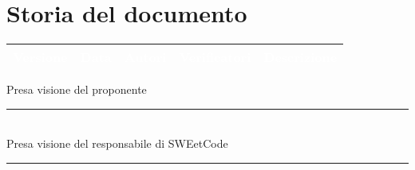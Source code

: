 \newpage
\section{Storia del documento} \label{sec:storia}
\begingroup
\setlength{\tabcolsep}{10pt}
\renewcommand{\arraystretch}{1.5}
\begin{tabularx}{\textwidth}{| l | l | X | X | X |}
    \hline
    \rowcolor{headerrow} \textbf{\textcolor{white}{Versione}} & \textbf{\textcolor{white}{Data}} & \textbf{\textcolor{white}{Autori}} & \textbf{\textcolor{white}{Verificatori}} & \textbf{\textcolor{white}{Descrizione}} \\
    \hline
\end{tabularx}
\endgroup
\begin{flushright}
\vspace{15pt}
Presa visione del proponente\\
\vspace{38pt}
\rule[10pt]{148pt}{0.4pt}\\
\vspace{15pt}
Presa visione del responsabile di SWEetCode\\
\vspace{38pt}
\rule[10pt]{148pt}{0.4pt}
\end{flushright}
